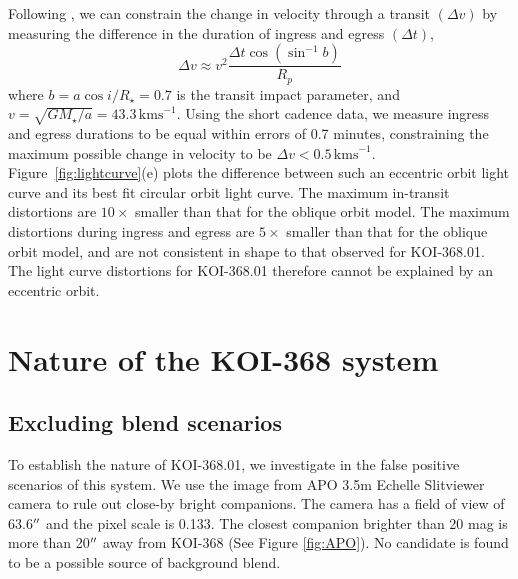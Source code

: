 \documentclass[iop]{emulateapj}
\begin{document}
Following \citet{Barnes2007}, we can constrain the change in velocity through a transit
$(\Delta v)$ by measuring the difference
in the duration of ingress and egress $(\Delta t)$,
\begin{equation}
  \Delta v \approx v^2 \frac{\Delta t \cos \left( \sin^{-1} b \right)}{R_p}
\end{equation}
where $b = a \cos i/R_\star = 0.7$ is the transit impact parameter, and $v =
\sqrt{G M_\star / a} = 43.3\,\text{kms}^{-1}$. Using
the short cadence data, we measure ingress and egress durations to be
equal within errors of 0.7 minutes, constraining the maximum
possible change in velocity to be $\Delta v <
0.5\,\text{kms}^{-1}$. Figure~\ref{fig:lightcurve}(e) plots the difference 
between such an eccentric orbit light curve and its best fit circular orbit
light curve. The maximum in-transit distortions are $10
\times$ smaller than that for the oblique orbit model. The maximum
distortions during ingress and egress are $5\times$ smaller than that
for the oblique orbit model, and are not consistent in shape to that
observed for KOI-368.01. The light curve distortions for KOI-368.01
therefore cannot be explained by an eccentric orbit.
%

\section{Nature of the KOI-368 system}
\label{sec:system-properties}

\subsection{Excluding blend scenarios}
\label{sec:excluding-blends}

To establish the nature of KOI-368.01, we investigate in the 
false positive scenarios of this system. We use the image from APO 3.5m 
Echelle Slitviewer camera to rule out close-by bright companions. The 
camera has a field of view of 63.6$\mbox{$^{\prime\prime}$}$ and the pixel scale is 0.133\pxs. 
The closest companion brighter than 20 mag is more than 20$\mbox{$^{\prime\prime}$}$ away from KOI-368 (See Figure \ref{fig:APO}). No candidate is found to be 
a possible source of background blend. 
\end{document}
